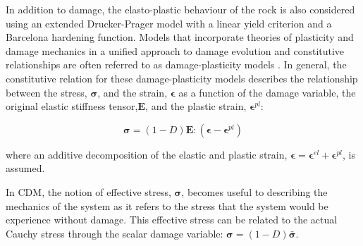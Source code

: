 In addition to damage, the elasto-plastic behaviour of the rock is also considered using an extended Drucker-Prager model with a linear yield criterion and a Barcelona hardening function. Models that incorporate theories of plasticity and damage mechanics in a unified approach to damage evolution and constitutive relationships are often referred to as damage-plasticity models \citep{zhang_continuum_2010}. In general, the constitutive relation for these damage-plasticity models describes the relationship between the stress, $\boldsymbol{\sigma}$, and the strain, $\boldsymbol{\epsilon}$ as a function of the damage variable, the original elastic stiffness tensor,$\mathbf{E}$, and the plastic strain, $\boldsymbol{\epsilon}^{pl}$: 

\begin{equation}
\boldsymbol{\sigma}=\left(1-D\right)\mathbf{E}:\left(\boldsymbol{\epsilon}-\boldsymbol{\epsilon}^{pl}\right)
\label{eqn:const5}
\end{equation}

where an additive decomposition of the elastic and plastic strain, $\boldsymbol{\epsilon}=\boldsymbol{\epsilon}^{el}+\boldsymbol{\epsilon}^{pl}$, is assumed.

In CDM, the notion of effective stress, $\boldsymbol{\sigma}$, becomes useful to describing the mechanics of the system as it refers to the stress that the system would be experience without damage. This effective stress can be related to the actual Cauchy stress through the scalar damage variable: $\boldsymbol{\sigma}=\left(1-D\right)\bar{\boldsymbol{\sigma}}$.
